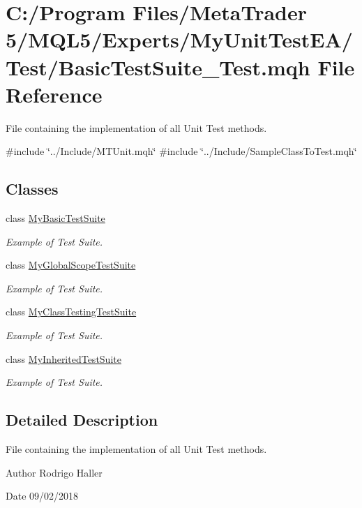 \hypertarget{_basic_test_suite___test_8mqh}{}\section{C\+:/\+Program Files/\+Meta\+Trader 5/\+M\+Q\+L5/\+Experts/\+My\+Unit\+Test\+E\+A/\+Test/\+Basic\+Test\+Suite\+\_\+\+Test.mqh File Reference}
\label{_basic_test_suite___test_8mqh}


File containing the implementation of all Unit Test methods.  


{\ttfamily \#include \char`\"{}../\+Include/\+M\+T\+Unit.\+mqh\char`\"{}}\newline
{\ttfamily \#include \char`\"{}../\+Include/\+Sample\+Class\+To\+Test.\+mqh\char`\"{}}\newline
\subsection*{Classes}
\begin{DoxyCompactItemize}
\item 
class \mbox{\hyperlink{class_my_basic_test_suite}{My\+Basic\+Test\+Suite}}
\begin{DoxyCompactList}\small\item\em Example of Test Suite. \end{DoxyCompactList}\item 
class \mbox{\hyperlink{class_my_global_scope_test_suite}{My\+Global\+Scope\+Test\+Suite}}
\begin{DoxyCompactList}\small\item\em Example of Test Suite. \end{DoxyCompactList}\item 
class \mbox{\hyperlink{class_my_class_testing_test_suite}{My\+Class\+Testing\+Test\+Suite}}
\begin{DoxyCompactList}\small\item\em Example of Test Suite. \end{DoxyCompactList}\item 
class \mbox{\hyperlink{class_my_inherited_test_suite}{My\+Inherited\+Test\+Suite}}
\begin{DoxyCompactList}\small\item\em Example of Test Suite. \end{DoxyCompactList}\end{DoxyCompactItemize}


\subsection{Detailed Description}
File containing the implementation of all Unit Test methods. 

\begin{DoxyAuthor}{Author}
Rodrigo Haller 
\end{DoxyAuthor}
\begin{DoxyDate}{Date}
09/02/2018 
\end{DoxyDate}
